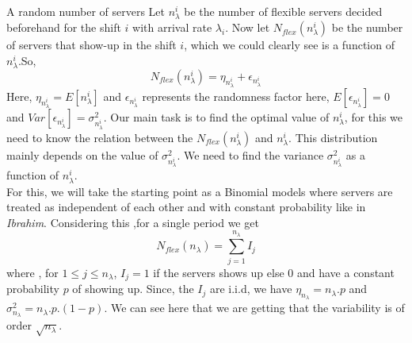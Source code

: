 \documentclass[8pt]{beamer}
\begin{document}
\begin{frame}{A random number of servers}
Let $n_\lambda^{i}$ be the number of flexible servers decided beforehand for the shift $i$ with arrival rate $\lambda_i$. Now let $N_{flex}(n_\lambda^{i})$ be the number of servers that show-up in the shift $i$, which we could clearly see is a function of $n_\lambda^{i}$.So,
$$N_{flex}(n_\lambda^{i})= \eta_{n_\lambda^{i}}+ \epsilon_{n_\lambda^{i}}$$
Here, $\eta_{n_\lambda^{i}}=E[n_\lambda^{i}]$ and $\epsilon_{n_\lambda^{i}}$ represents the randomness factor here, $E[\epsilon_{n_\lambda^{i}}]=0$ and $Var[\epsilon_{n_\lambda^{i}}]=\sigma_{n_\lambda^{i}}^{2}$. Our main task is to find the optimal value of $n_\lambda^{i}$, for this we need to know the relation between the $N_{flex}(n_\lambda^{i})$ and $n_\lambda^{i}$. This distribution mainly depends on the value of $\sigma_{n_\lambda^{i}}^{2}$. We need to find the variance $\sigma_{n_\lambda^{i}}^{2}$ as a function of $n_\lambda^{i}$.
\\ For this, we will take the starting point as a Binomial models where servers are treated as independent of each other and with constant probability like in \textit{Ibrahim}\cite{ibrahim}.
Considering this ,for a single period we get
$$N_{flex}(n_{\lambda})=\sum_{j=1}^{n_{\lambda}}{I_j}$$ where , for $1 \leq j \leq n_{\lambda}$, $I_j=1$ if the servers shows up else $0$ and have a constant probability $p$ of showing up. Since, the $I_j$ are i.i.d, we have $\eta_{n_\lambda}=n_{\lambda}.p$ and $\sigma_{n_\lambda}^{2}= n_{\lambda}.p.(1-p)$. We can see here that we are getting that the variability is of order $\sqrt{n_\lambda}$. 
\end{frame}
\end{document}
